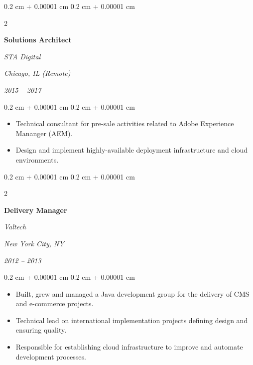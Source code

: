 \documentclass[10pt, a4paper]{article}
\newenvironment{highlights}{
    \begin{itemize}[
        topsep=0.10 cm,
        parsep=0.10 cm,
        partopsep=0pt,
        itemsep=0pt,
        leftmargin=0.4 cm + 10pt
    ]
}{
    \end{itemize}
} %
\newenvironment{onecolentry}{
    \begin{adjustwidth}{
        0.2 cm + 0.00001 cm
    }{
        0.2 cm + 0.00001 cm
    }
}{
    \end{adjustwidth}
} %
\newenvironment{twocolentry}[2][]{
    \onecolentry
    \def\secondColumn{#2}
    \setcolumnwidth{\fill, 8 cm}
    \begin{paracol}{2}
}{
    \switchcolumn \raggedleft \secondColumn
    \end{paracol}
    \endonecolentry
} %
\begin{document}
\vspace{0.20 cm}



%
%
\begin{twocolentry}{
        \textit{Chicago, IL (Remote)}

        \textit{2015 – 2017}}
    \textbf{Solutions Architect}

    \textit{STA Digital}
\end{twocolentry}

\vspace{0.10 cm}
\begin{onecolentry}
    \begin{highlights}
        \item Technical consultant for pre-sale activities related to Adobe Experience Mananger (AEM).
        \item Design and implement highly-available deployment infrastructure and cloud environments.
    \end{highlights}
\end{onecolentry}

\vspace{0.20 cm}



%
%
\begin{twocolentry}{
        \textit{New York City, NY}

        \textit{2012 – 2013}}
    \textbf{Delivery Manager}

    \textit{Valtech}
\end{twocolentry}

\vspace{0.10 cm}
\begin{onecolentry}
    \begin{highlights}
        \item Built, grew and managed a Java development group for the delivery of CMS and e-commerce projects.
        \item Technical lead on international implementation projects defining design and ensuring quality.
        \item Responsible for establishing cloud infrastructure to improve and automate development processes.
    \end{highlights}
\end{onecolentry}

\vspace{0.20 cm}
\end{document}
